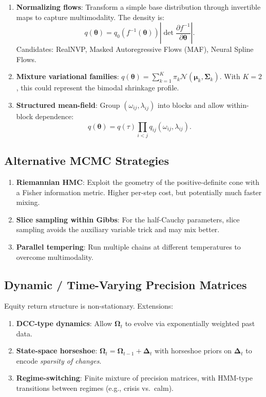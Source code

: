 \documentclass[11pt,a4paper]{article}
\newcommand{\Normal}{\mathcal{N}}
\newcommand{\bOmega}{\bm{\Omega}}
\begin{document}
\begin{enumerate}
  \item \textbf{Normalizing flows}: Transform a simple base distribution through invertible maps to capture multimodality. The density is:
  \begin{equation}
    q(\bm{\theta}) = q_0(f^{-1}(\bm{\theta}))\left|\det\frac{\partial f^{-1}}{\partial\bm{\theta}}\right|.
  \end{equation}
  Candidates: RealNVP, Masked Autoregressive Flows (MAF), Neural Spline Flows.

  \item \textbf{Mixture variational families}: $q(\bm{\theta}) = \sum_{k=1}^K \pi_k \Normal(\bm{\mu}_k, \bm{\Sigma}_k)$. With $K=2$, this could represent the bimodal shrinkage profile.

  \item \textbf{Structured mean-field}: Group $(\omega_{ij}, \lambda_{ij})$ into blocks and allow within-block dependence:
  \begin{equation}
    q(\bm{\theta}) = q(\tau)\prod_{i<j}q_{ij}(\omega_{ij}, \lambda_{ij}).
  \end{equation}
\end{enumerate}

\subsection{Alternative MCMC Strategies}

\begin{enumerate}
  \item \textbf{Riemannian HMC}: Exploit the geometry of the positive-definite cone with a Fisher information metric. Higher per-step cost, but potentially much faster mixing.
  \item \textbf{Slice sampling within Gibbs}: For the half-Cauchy parameters, slice sampling avoids the auxiliary variable trick and may mix better.
  \item \textbf{Parallel tempering}: Run multiple chains at different temperatures to overcome multimodality.
\end{enumerate}

\subsection{Dynamic / Time-Varying Precision Matrices}

Equity return structure is non-stationary. Extensions:
\begin{enumerate}
  \item \textbf{DCC-type dynamics}: Allow $\bOmega_t$ to evolve via exponentially weighted past data.
  \item \textbf{State-space horseshoe}: $\bOmega_t = \bOmega_{t-1} + \bm{\Delta}_t$ with horseshoe priors on $\bm{\Delta}_t$ to encode \emph{sparsity of changes}.
  \item \textbf{Regime-switching}: Finite mixture of precision matrices, with HMM-type transitions between regimes (e.g., crisis vs.\ calm).
\end{enumerate}
\end{document}
